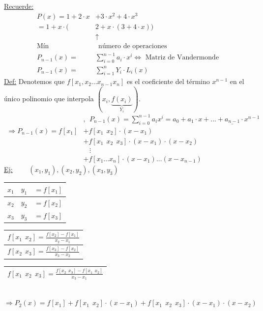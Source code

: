 \underline{Recuerde:}
\begin{align*}
 P(x)  = 1+2 \cdot x&+3 \cdot x^2 + 4 \cdot x^3 \\
  =1+x \cdot (&2+x \cdot (3+4 \cdot x)) \\
  &\uparrow\\
  \text{Mín} &\ \ \text{número de operaciones}\\
 P_{n-1}(x)  = &\sum_{i=0}^{n-1} a_{i} \cdot x^i \Leftrightarrow \text{ Matriz de Vandermonde} \\
 P_{n-1}(x)  = &\sum_{i=1}^{n} Y_{i} \cdot L_{i}(x)
\end{align*}
\underline{Def:}  Denotemos que \underline{$f[x_{1}, x_{2} ... x_{n-1} x_{n}]$} es el coeficiente del término $x^{n-1}$ en el único polinomio que interpola $(x_{i}, \underbrace{f(x_{i})}_{Y_{i}})$. 
\begin{align*}
 & , \ \ P_{n-1}(x)= \sum_{i=0}^{n-1} a_{i} x^i = a_{0} + a_{1} \cdot x +...+\underline{a_{n-1}} \cdot x^{n-1} \\
 \Rightarrow P_{n-1}(x) = f [x_{1}] & + f[x_{1} \ \ x_{2}] \cdot (x-x_{1}) \\ 
 & +f[x_{1} \ \ x_{2} \ \ x_{3}] \cdot (x-x_{1}) \cdot (x-x_{2}) \\
 & \ \ \ \ \vdots \\
 & + f[x_{1} ... x_{n}] \cdot (x-x_{1}) ... (x-x_{n-1})
\end{align*}
\underline{Ej:} \ \ \ \ $(x_{1}, y_{1}), (x_{2}, y_{2}), (x_{3}, y_{3})$\\[2\baselineskip]
\begin{center}
\begin{tabular}{|c|c|c|}
\hline
$x_{1}$ & $y_{1} $ & $ \displaystyle = f[x_{1}]$ \\
\hline 
$x_{2}$ & $y_{2}$  & $= f[x_{2}]$ \\ 
\hline 
$x_{3}$ & $y_{3}$  & $= f[x_{3}]$\\
\hline 
\end{tabular} 
\hspace*{-0.19cm}
\begin{tabular}{|c|}
\hline
$ \displaystyle f[x_{1} \ \ x_{2}]=   \frac{f[x_{2}] - f[x_{1}]}{x_{2}-x_{1}}$ \\
\hline
$ \displaystyle f[x_{2} \ \ x_{3}] = \frac{f[x_{3}] - f[x_{2}]}{x_{3}-x_{2}}$\\
\hline
\end{tabular}
\hspace*{-0.19cm}
\begin{tabular}{|c|}
\hline
$ \displaystyle f[x_{1} \ \ x_{2} \ \ x_{3}] = \frac{f[x_{2} \ \  x_{3}] - f[x_{1} \ \  x_{2}]}{x_{3} - x_{1}}$ \\
\hline
\end{tabular}
\vspace*{0.5cm} \\
 $\Rightarrow P_{2}(x)=f[x_{1}]+f[x_{1} \ \ x_{2}] \cdot (x-x_{1})+f[x_{1} \ \ x_{2} \ \ x_{3}] \cdot (x-x_{1}) \cdot (x-x_{2})$
\end{center}


